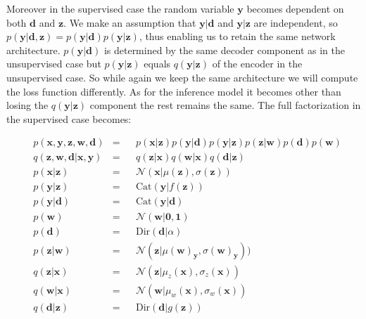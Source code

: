 \documentclass[11pt, a4paper]{report}
\theoremstyle{plain}
\theoremstyle{definition}
\theoremstyle{remark}
\newcommand{\x}{\mathbf{x}}
\newcommand{\z}{\mathbf{z}}
\newcommand{\y}{\mathbf{y}}
\newcommand{\w}{\mathbf{w}}
\newcommand{\dd}{\mathbf{d}}
\newcommand{\NN}{\mathcal{N}}
\newcommand{\bv}[1]{\boldsymbol{#1}}
\begin{document}
Moreover in the supervised case the random variable $\y$ becomes dependent on both $\dd$ and $\z$.
We make an assumption that $\y | \dd$ and $\y | \z$ are independent, so
$p(\y | \dd, \z) = p(\y | \dd)p(\y | \z)$, thus enabling us to retain the same 
network architecture. $p(\y | \dd)$ is determined by
the same decoder component as in the unsupervised case but $p(\y | \z)$ equals 
$q(\y | \z)$ of the encoder in the unsupervised case. So while again we keep the same
architecture we will compute the loss function differently.
As for the inference model it becomes other than losing the $q(\y | \z)$
component the rest remains the same.
The full factorization in the supervised case becomes:

\begin{equation}
\begin{aligned}
&p(\x, \y, \z, \w, \dd) &=& 
&p(\x | \z) p(\y | \dd) p(\y | \z) p(\z | \w) p(\dd) p(\w) \\
&q(\z, \w, \dd | \x, \y) &=& 
&q(\z | \x) q(\w | \x) q(\dd | \z) \\
&p(\x | \z) &=& & \NN(\x | \mu(\z), \sigma(\z)) \\
&p(\y | \z) &=& &\text{Cat}(\y | f(\z)) \\
&p(\y | \dd) &=& & \text{Cat}(\y | \dd) \\
&p(\w) &=& & \NN(\w | \bv{0},\bv{1}) \\
&p(\dd) &=& & \text{Dir}(\dd | \alpha) \\
&p(\z | \w) &=& & \NN(\z | \mu(\w)_{\y}, \sigma(\w)_{\y})) \\
&q(\z | \x) &=& &\NN(\z | \mu_z(\x), \sigma_z(\x)) \\
&q(\w | \x) &=& &\NN(\w | \mu_w(\x), \sigma_w(\x)) \\
&q(\dd | \z) &=& &\text{Dir}(\dd | g(\z))
\label{eq:gmmfact_supervised}
\end{aligned}
\end{equation}
\end{document}
